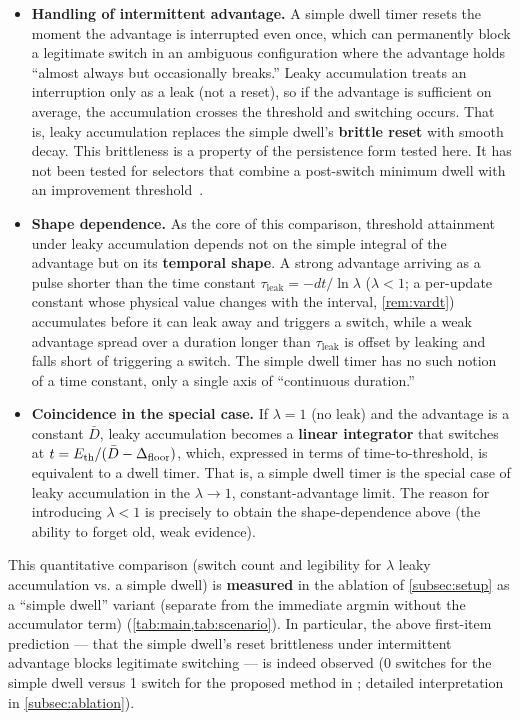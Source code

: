 \begin{itemize}
\item \textbf{Handling of intermittent advantage.} A simple dwell timer resets the moment the advantage is interrupted even once, which can permanently block a legitimate switch in an ambiguous configuration where the advantage holds ``almost always but occasionally breaks.'' Leaky accumulation treats an interruption only as a leak (not a reset), so if the advantage is sufficient on average, the accumulation crosses the threshold and switching occurs. That is, leaky accumulation replaces the simple dwell's \textbf{brittle reset} with smooth decay. This brittleness is a property of the persistence form tested here. It has not been tested for selectors that combine a post-switch minimum dwell with an improvement threshold~\citep{hespanha1999dwell,li2026bigcbf}.
\item \textbf{Shape dependence.} As the core of this comparison, threshold attainment under leaky accumulation depends not on the simple integral of the advantage but on its \textbf{temporal shape}. A strong advantage arriving as a pulse shorter than the time constant $\tau_{\text{leak}} = -dt/\ln\lambda$ ($\lambda<1$; a per-update constant whose physical value changes with the interval, \cref{rem:vardt}) accumulates before it can leak away and triggers a switch, while a weak advantage spread over a duration longer than $\tau_{\text{leak}}$ is offset by leaking and falls short of triggering a switch. The simple dwell timer has no such notion of a time constant, only a single axis of ``continuous duration.''
\item \textbf{Coincidence in the special case.} If $\lambda = 1$ (no leak) and the advantage is a constant $\bar D$, leaky accumulation becomes a \textbf{linear integrator} that switches at $t = E_{\text{th}}/(\bar D - \Delta_{\text{floor}})$, which, expressed in terms of time-to-threshold, is equivalent to a dwell timer. That is, a simple dwell timer is the special case of leaky accumulation in the $\lambda \to 1$, constant-advantage limit. The reason for introducing $\lambda < 1$ is precisely to obtain the shape-dependence above (the ability to forget old, weak evidence).
\end{itemize}

This quantitative comparison (switch count and legibility for $\lambda$ leaky accumulation vs. a simple dwell) is \textbf{measured} in the ablation of \cref{subsec:setup} as a ``simple dwell'' variant (separate from the immediate argmin without the accumulator term) (\cref{tab:main,tab:scenario}). In particular, the above first-item prediction --- that the simple dwell's reset brittleness under intermittent advantage blocks legitimate switching --- is indeed observed (0 switches for the simple dwell versus 1 switch for the proposed method in ; detailed interpretation in \cref{subsec:ablation}).

